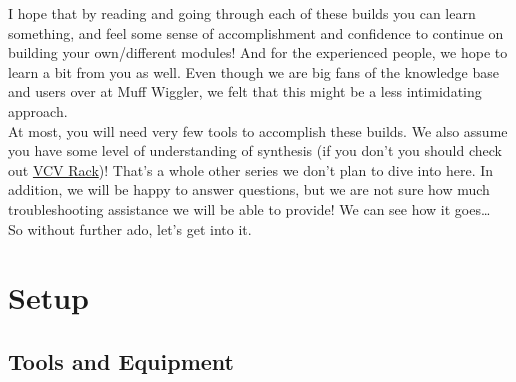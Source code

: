 \documentclass{article}
\begin{document}
\newline
I hope that by reading and going through each of these builds you can learn something, and feel some sense of accomplishment and confidence to continue on building your own/different modules! And for the experienced people, we hope to learn a bit from you as well. Even though we are big fans of the knowledge base and users over at Muff Wiggler, we felt that this might be a less intimidating approach. \\
\newline
At most, you will need very few tools to accomplish these builds. We also assume you have some level of understanding of synthesis (if you don't you should check out \href{https://vcvrack.com}{VCV Rack})! That's a whole other series we don't plan to dive into here. In addition, we will be happy to answer questions, but we are not sure how much troubleshooting assistance we will be able to provide! We can see how it goes… \\
\newline
So without further ado, let's get into it.

\section{Setup}

\subsection{Tools and Equipment}
\end{document}
